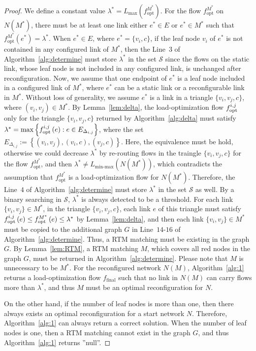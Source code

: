 \documentclass[sigconf]{acmart}
\begin{document}
\begin{proof}
We define a constant value  $\lambda^*=L_{\text{max}}\left( f^{M^*}_{\text{opt}}\right)$. For the flow $f^{M^*}_{\text{opt}}$ on $N\left( M^* \right) $, there must be at least one link either $e^*\in E$ or $e^*\in M^{*}$ such that $f^{M^*}_{\text{opt}}\left( e^*\right)=\lambda^*$. When $e^*\in E$, where $e^*=\{v_i,c\}$,  if the leaf node $v_i$ of $e^*$ is not contained in any configured link of $M^*$, then the Line~$3$ of Algorithm~\ref{alg:determine} must store $\lambda^*$ in the set $\mathcal{S}$ since the flows on the static link, whose leaf node is not included in any configured link, is unchanged after reconfiguration. Now, we assume that one endpoint of $e^*$ is a leaf node included in a configured link of $M^*$, where $e^*$ can be a static link or a reconfigurable link in $M^*$. Without loss of generality, we assume $e^*$ is a link in a triangle $\{v_i,v_j,c\}$, where $(v_i,v_j)\in M^*$. By Lemma~\ref{lem:delta}, the load-optimization flow $f_{\textnormal{opt}}^{i,j}$ only for the triangle $\{v_i,v_j,c\}$ returned by Algorithm~\ref{alg:delta}  must satisfy $\lambda^*=\max\left\{f_{\textnormal{opt}}^{i,j}\left(e\right): e\in E_{\Delta_{i,j}}\right\}$, where the set $E_{\Delta_{i,j}}:=\left\{(v_i,v_j), (v_i,c), (v_j,c)\right\}$. Here, the equivalence must be hold, otherwise we could decrease $\lambda^*$ by re-routing flows in the traingle $\{v_i,v_j,c\}$ for the flow $f^{M^*}_{\text{opt}}$, and then $\lambda^* \neq L_{\text{min-max}}\left( N\left( M^*\right) \right) $, which contradicts the assumption that $f^{M^*}_{\text{opt}}$ is a load-optimization flow for $N(M^*)$. Therefore, the Line~$4$ of Algorithm~\ref{alg:determine} must store $\lambda^*$ in the set $\mathcal{S}$ as well. By a binary searching in $\mathcal{S}$, $\lambda^*$ is always detected to be a threshold. For each link $\{v_i,v_j\}\in M^*$, in the triangle $\{v_i,v_j,c\}$, each link $e$ of this triangle must satisfy $f_{\textnormal{opt}}^{i,j}\left(e\right)\leq f^{M^*}_{\text{opt}}\left( e\right)\leq \lambda^*$ by Lemma~\ref{lem:delta}, and then each link  $\{v_i,v_j\}\in M^*$ must be copied to the additional graph $G$ in Line~$14$-$16$ of Algorithm~\ref{alg:determine}. Thus, a RTM matching must be existing in the graph $G$. By Lemma~\ref{lem:RTM}, a RTM matching $M$, which covers all red nodes in the graph $G$, must be returned in Algorithm~\ref{alg:determine}. Please note that $M$ is unnecessary to be $M^*$. For the reconfigured network $N(M)$, Algorithm~\ref{alg:1} returns a load-optimization flow $f_{\text{final}}$ such that no link in $N(M)$ can carry flows more than $\lambda^*$, and thus $M$ must be an optimal reconfiguration for $N$.

On the other hand, if the number of leaf nodes is more than one, then there always exists an optimal reconfiguration for a start network $N$. Therefore, Algorithm~\ref{alg:1} can always return a correct solution. When the number of leaf nodes is one, then a RTM matching cannot exist in the graph $G$, and thus Algorithm~\ref{alg:1} returns ''null''.
\end{proof}
\end{document}
